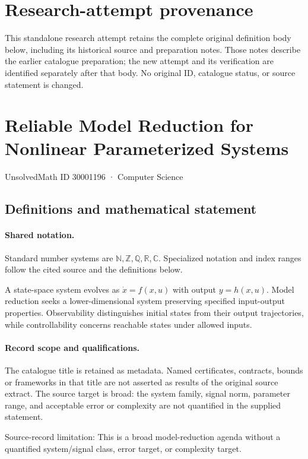 \documentclass[11pt]{article}
\begin{document}
\section*{Research-attempt provenance}
This standalone research attempt retains the complete original definition body below,
including its historical source and preparation notes. Those notes describe the
earlier catalogue preparation; the new attempt and its verification are identified
separately after that body. No original ID, catalogue status, or source statement is changed.

\section{Reliable Model Reduction for Nonlinear Parameterized Systems}\label{30001196}
{\small UnsolvedMath ID 30001196 · Computer Science}
\subsection{Definitions and mathematical statement}

\paragraph{Shared notation.}Standard number systems are $\mathbb N,\mathbb Z,\mathbb Q,\mathbb R,\mathbb C$. Specialized notation and index ranges follow the cited source and the definitions below.


A state-space system evolves as $\dot x=f(x,u)$ with output $y=h(x,u)$. Model reduction seeks a lower-dimensional system preserving specified input-output properties. Observability distinguishes initial states from their output trajectories, while controllability concerns reachable states under allowed inputs.
\paragraph{Record scope and qualifications.}
The catalogue title is retained as metadata. Named certificates, contracts, bounds or frameworks in that title are not asserted as results of the original source extract.
The source target is broad: the system family, signal norm, parameter range, and acceptable error or complexity are not quantified in the supplied statement.

Source-record limitation: This is a broad model-reduction agenda without a quantified system/signal class, error target, or complexity target.
\end{document}
